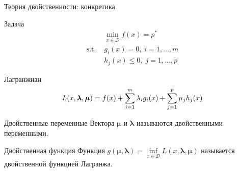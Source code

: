 \documentclass[12pt]{beamer}
\newcommand{\blambda}{\boldsymbol{\lambda}}
\newcommand{\bmu}{\boldsymbol{\mu}}
\begin{document}
\begin{frame}{Теория двойственности: конкретика}
\small
\vspace{-2mm}
\begin{block}{Задача}
\vspace{-5mm}
\begin{equation*}
\begin{split}
& \min\limits_{x \in \mathcal{D}} f(x) = p^*\\
\text{s.t. } & g_i(x) = 0, \; i = 1,\ldots,m\\
& h_j(x) \leq 0, \; j = 1,\ldots, p
\end{split}
\end{equation*}
\end{block}

\begin{block}{Лагранжиан}
\vspace{-2mm}
\begin{equation*}
L(x, \blambda, \bmu) = f(x) + \sum\limits_{i=1}^m\lambda_i g_i(x) + \sum\limits_{j=1}^p \mu_j h_j(x)
\vspace{-2mm}
\end{equation*}
\end{block}

\begin{block}{Двойственные переменные}
Вектора $\bmu$ и $\blambda$ называются двойственными переменными.
\end{block}

\begin{block}{Двойственная функция}
Функция $g(\bmu, \blambda) = \inf\limits_{x\in \mathcal{D}} L(x, \blambda, \bmu)$ называется двойственной функцией Лагранжа.
\end{block}

\end{frame}
\end{document}
